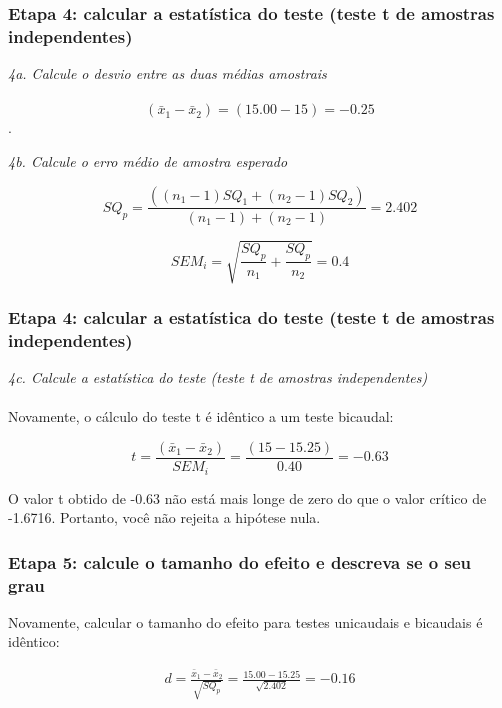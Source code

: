 \documentclass[11pt]{beamer}
\begin{document}
\begin{frame}
\frametitle{Etapa 4: calcular a estatística do teste (teste t de amostras independentes)}
\textit{4a. Calcule o desvio entre as duas médias amostrais}\\~\\

\[(\bar{x}_1 - \bar{x}_2) = (15.00-15) = -0.25\].

\textit{4b. Calcule o erro médio de amostra esperado}

\[SQ_p = \frac{((n_1-1)SQ_1+(n_2-1)SQ_2)}{(n_1-1)+(n_2-1)} = 2.402\]

\[SEM_i = \sqrt{\frac{SQ_p}{n_1}+\frac{SQ_p}{n_2}} = 0.4\]
\end{frame}

\begin{frame}
\frametitle{Etapa 4: calcular a estatística do teste (teste t de amostras independentes)}
\textit{4c. Calcule a estatística do teste (teste t de amostras independentes)}\\~\\

Novamente, o cálculo do teste t é idêntico a um teste bicaudal:

\[t = \frac{(\bar{x}_1 - \bar{x}_2)}{SEM_i} = \frac{(15 - 15.25)}{0.40} = -0.63\]

O valor t obtido de -0.63 não está mais longe de zero do que o valor crítico de -1.6716. Portanto, você não rejeita a hipótese nula.
\end{frame}

\begin{frame}
\frametitle{Etapa 5: calcule o tamanho do efeito e descreva se o seu grau}
Novamente, calcular o tamanho do efeito para testes unicaudais e bicaudais é idêntico:
 
\begin{align*}
d = \frac{\bar{x}_1 - \bar{x}_2}{\sqrt{SQ_p}} = \frac{15.00-15.25}{\sqrt{2.402}} = -0.16
\end{align*}

\end{frame}
\end{document}
